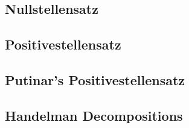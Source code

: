 \subsection{Nullstellensatz}

\subsection{Positivestellensatz}


\subsection{Putinar's Positivestellensatz}

\subsection{Handelman Decompositions}





